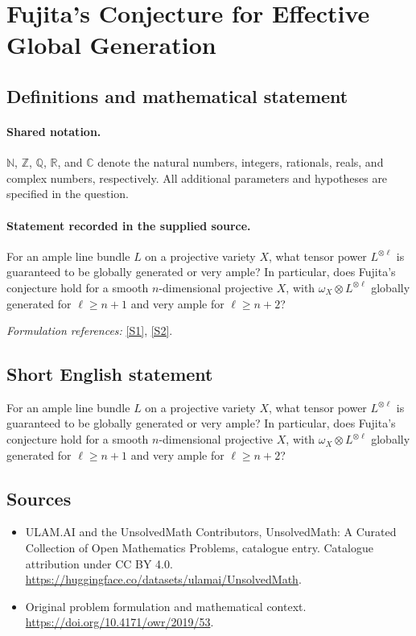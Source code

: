 \documentclass[11pt]{article}
\newcommand{\sref}[2]{\hyperlink{source:#1:#2}{[S#2]}}
\begin{document}
\section{Fujita's Conjecture for Effective Global Generation}\label{statement}

\subsection{Definitions and mathematical statement}

\paragraph{Shared notation.}$\mathbb N$, $\mathbb Z$, $\mathbb Q$, $\mathbb R$, and $\mathbb C$ denote the natural numbers, integers, rationals, reals, and complex numbers, respectively. All additional parameters and hypotheses are specified in the question.


\paragraph{Statement recorded in the supplied source.}
For an ample line bundle $L$ on a projective variety $X$, what tensor power $L^{\otimes\ell}$ is guaranteed to be globally generated or very ample? In particular, does Fujita's conjecture hold for a smooth $n$-dimensional projective $X$, with $\omega_X\otimes L^{\otimes\ell}$ globally generated for $\ell\geq n+1$ and very ample for $\ell\geq n+2$?
\par\smallskip\textit{Formulation references:} \sref{statement}{1}, \sref{statement}{2}.
\subsection{Short English statement}
For an ample line bundle $L$ on a projective variety $X$, what tensor power $L^{\otimes\ell}$ is guaranteed to be globally generated or very ample? In particular, does Fujita's conjecture hold for a smooth $n$-dimensional projective $X$, with $\omega_X\otimes L^{\otimes\ell}$ globally generated for $\ell\geq n+1$ and very ample for $\ell\geq n+2$?
\subsection{Sources}
\begin{itemize}
\item[\hypertarget{source:statement:1}{S1}] ULAM.AI and the UnsolvedMath Contributors, UnsolvedMath: A Curated Collection of Open Mathematics Problems, catalogue entry. Catalogue attribution under CC BY 4.0.
\url{https://huggingface.co/datasets/ulamai/UnsolvedMath}.
\item[\hypertarget{source:statement:2}{S2}] Original problem formulation and mathematical context.
\url{https://doi.org/10.4171/owr/2019/53}.
\end{itemize}
\label{end:statement}
\end{document}
